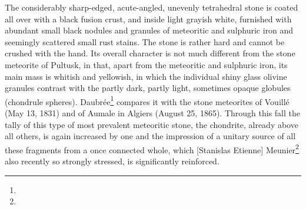 \documentclass[a4paper, 12pt, oneside]{article}
\begin{document}
The considerably sharp-edged, acute-angled, unevenly tetrahedral stone is coated all over with a black fusion crust, and inside light grayish white, furnished with abundant small black nodules and granules of meteoritic and sulphuric iron and seemingly scattered small rust stains. The stone is rather hard and cannot be crushed with the hand. Its overall character is not much different from the stone meteorite of Pultusk, in that, apart from the meteoritic and sulphuric iron, its main mass is whitish and yellowish, in which the individual shiny glass olivine granules contrast with the partly dark, partly light, sometimes opaque globules (chondrule spheres). Daubrée\footnote{} compares it with the stone meteorites of Vouillé (May 13, 1831) and of Aumale in Algiers (August 25, 1865). Through this fall the tally of this type of most prevalent meteoritic stone, the chondrite, already above all others, is again increased by one and the impression of a unitary source of all these fragments from a once connected whole, which [Stanislas Etienne] Meunier\footnote{} also recently so strongly stressed, is significantly reinforced.
\end{document}
